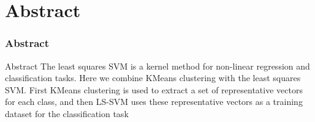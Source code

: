 \documentclass{beamer}
\begin{document}
    \section{Abstract}
    \begin{frame}[fragile]
        \frametitle{Abstract}
        \begin{block}{Abstract}
            The least squares SVM is a kernel method for non-linear regression and classification tasks.
            Here we combine KMeans clustering with the least squares SVM. First KMeans clustering is used to extract a set of representative vectors for each class, and then LS-SVM uses these representative vectors as a training dataset for the classification task
        \end{block}

    \end{frame}
\end{document}
